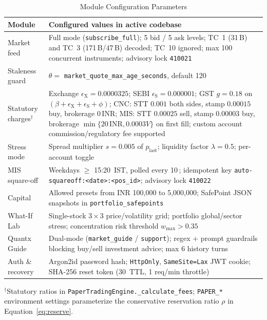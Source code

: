 \documentclass[journal,onecolumn,10pt]{IEEEtran}
\newcommand{\thinunit}[2]{#1\,\text{#2}}
\begin{document}
\begin{table}[!t]
\caption{Module Configuration Parameters}
\label{tab:config}
\centering
\small
\renewcommand{\arraystretch}{1.12}
\begin{tabularx}{\textwidth}{@{}>{\raggedright\arraybackslash}p{1.35in}X@{}}
\toprule
Module & Configured values in active codebase \\
\midrule
Market feed & Full mode (\texttt{subscribe\_full}); 5 bid / 5 ask levels; TC~1 (31\,B) and TC~3 (171\,B/47\,B) decoded; TC~10 ignored; max 100 concurrent instruments; advisory lock \texttt{410021} \\
Staleness guard & $\theta=$ \texttt{market\_quote\_max\_age\_seconds}, default \thinunit{120}{s} \\
Statutory charges$^{\dagger}$ & Exchange $\epsilon_{\mathrm{X}}=0.0000325$; SEBI $\epsilon_{\mathrm{S}}=0.000001$; GST $g=0.18$ on $(\beta+\epsilon_{\mathrm{X}}+\epsilon_{\mathrm{S}}+\phi)$; CNC: STT $0.001$ both sides, stamp $0.00015$ buy, brokerage $\thinunit{0}{INR}$; MIS: STT $0.00025$ sell, stamp $0.00003$ buy, brokerage $\min\{\thinunit{20}{INR}, 0.0003V\}$ on first fill; custom account commission/regulatory fee supported \\
Stress mode & Spread multiplier $s=0.005$ of $p_{\mathrm{last}}$; liquidity factor $\lambda=0.5$; per-account toggle \\
MIS square-off & Weekdays $\ge$ 15:20~IST, polled every \thinunit{10}{s}; idempotent key \texttt{auto-squareoff:<date>:<pos\_id>}; advisory lock \texttt{410022} \\
Capital & Allowed presets from INR 100,000 to 5,000,000; SafePoint JSON snapshots in \texttt{portfolio\_safepoints} \\
What-If Lab & Single-stock $3\times 3$ price/volatility grid; portfolio global/sector stress; concentration risk threshold $w_{\max} > 0.35$ \\
Quantx Guide & Dual-mode (\texttt{market\_guide} / \texttt{support}); regex + prompt guardrails blocking buy/sell investment advice; max 6 history turns \\
Auth \& recovery & Argon2id password hash; \texttt{HttpOnly}, \texttt{SameSite=Lax} JWT cookie; SHA-256 reset token (\thinunit{30}{min} TTL, 1 req/min throttle) \\
\bottomrule
\end{tabularx}

\vspace{2pt}
{\footnotesize $^{\dagger}$Statutory ratios in \texttt{PaperTradingEngine.\_calculate\_fees}; \texttt{PAPER\_*} environment settings parameterize the conservative reservation ratio $\rho$ in Equation~\eqref{eq:reserve}.}
\end{table}
\end{document}
